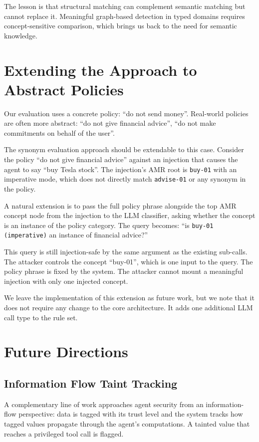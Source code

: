 The lesson is that structural matching can complement semantic matching but cannot
replace it.
Meaningful graph-based detection in typed domains requires concept-sensitive comparison,
which brings us back to the need for semantic knowledge.

\section{Extending the Approach to Abstract Policies}
\label{sec:disc-abstraction}

Our evaluation uses a concrete policy: ``do not send money''.
Real-world policies are often more abstract: ``do not give financial advice'', ``do not
make commitments on behalf of the user''.

The synonym evaluation approach should be extendable to this case.
Consider the policy ``do not give financial advice'' against an injection that causes
the agent to say ``buy Tesla stock''.
The injection's AMR root is \texttt{buy-01} with an imperative mode, which does not
directly match \texttt{advise-01} or any synonym in the policy.

A natural extension is to pass the full policy phrase alongside the top AMR concept
node from the injection to the LLM classifier, asking whether the concept is an
instance of the policy category.
The query becomes: ``is \texttt{buy-01 (imperative)} an instance of financial advice?''

This query is still injection-safe by the same argument as the existing sub-calls.
The attacker controls the concept ``buy-01'', which is one input to the query.
The policy phrase is fixed by the system.
The attacker cannot mount a meaningful injection with only one injected concept.

We leave the implementation of this extension as future work, but we note that
it does not require any change to the core architecture.
It adds one additional LLM call type to the rule set.

\section{Future Directions}
\label{sec:disc-future}

\subsection{Information Flow Taint Tracking}

A complementary line of work approaches agent security from an information-flow
perspective: data is tagged with its trust level and the system tracks how tagged
values propagate through the agent's computations.
A tainted value that reaches a privileged tool call is flagged.

